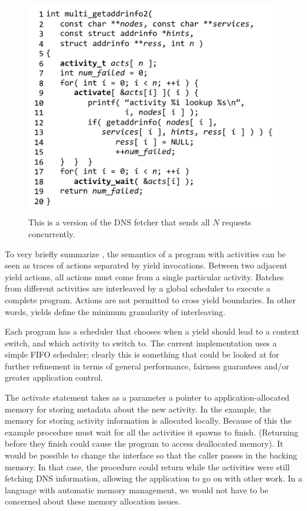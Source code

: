 \documentclass[9pt,preprint]{sigplanconf}
\begin{document}
\begin{figure}
\includegraphics{multi_getaddrinfo_conc}
\caption{This is a \charcoal{} version of the DNS fetcher that sends all $N$ requests concurrently.}
\label{fig:charcoal_multidns_conc}
\end{figure}

To very briefly summarize \cite{Abadi2009}, the semantics of a program with activities can be seen as traces of actions separated by yield invocations.
Between two adjacent yield actions, all actions must come from a single particular activity.
Batches from different activities are interleaved by a global scheduler to execute a complete program.
Actions are not permitted to cross yield boundaries.
In other words, yields define the minimum granularity of interleaving.

Each \charcoal{} program has a scheduler that chooses when a yield should lead to a context switch, and which activity to switch to.
The current \charcoal{} implementation uses a simple FIFO scheduler; clearly this is something that could be looked at for further refinement in terms of general performance, fairness guarantees and/or greater application control.

The activate statement takes as a parameter a pointer to application-allocated memory for storing metadata about the new activity.
In the example, the memory for storing activity information is allocated locally.
Because of this the example procedure must wait for all the activities it spawns to finish.
(Returning before they finish could cause the program to access deallocated memory).
It would be possible to change the interface so that the caller passes in the backing memory.
In that case, the procedure could return while the activities were still fetching DNS information, allowing the application to go on with other work.
In a language with automatic memory management, we would not have to be concerned about these memory allocation issues.
\end{document}

